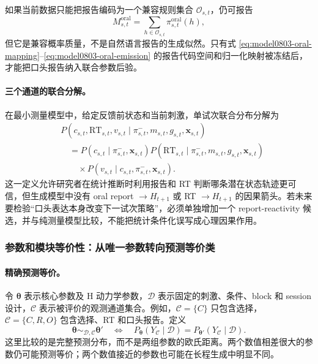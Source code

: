 如果当前数据只能把报告编码为一个兼容规则集合 $\mathcal O_{s,t}$，仍可报告
\begin{equation}
    M^{\mathrm{oral}}_{s,t}
    =\sum_{h\in\mathcal O_{s,t}}
      \pi^{\mathrm{oral}}_{s,t}(h),
\end{equation}
但它是兼容概率质量，不是自然语言报告的生成似然。只有式 \ref{eq:model0803-oral-mapping}--\ref{eq:model0803-oral-emission} 的报告代码空间和归一化映射被冻结后，才能把口头报告纳入联合参数后验。

\paragraph{三个通道的联合分解。}
在最小测量模型中，给定反馈前状态和当前刺激，单试次联合分布分解为
\begin{align}
    &P(c_{s,t},\mathrm{RT}_{s,t},v_{s,t}
      \mid\pi^-_{s,t},m_{s,t},g_{s,t},\mathbf x_{s,t})\nonumber\\
    &\quad=
    P(c_{s,t}\mid\pi^-_{s,t},\mathbf x_{s,t})
    P(\mathrm{RT}_{s,t}\mid
      \pi^-_{s,t},m_{s,t},g_{s,t},\mathbf x_{s,t})\nonumber\\
    &\qquad\times
    P(v_{s,t}\mid
      c_{s,t},\pi^-_{s,t},\mathbf x_{s,t}).
    \label{eq:model0803-joint-emission}
\end{align}
这一定义允许研究者在统计推断时利用报告和 RT 判断哪条潜在状态轨迹更可信，但生成模型中没有 oral report $\rightarrow H_{t+1}$ 或 RT $\rightarrow H_{t+1}$ 的因果箭头。若未来要检验“口头表达本身改变下一试次策略”，必须单独增加一个 report-reactivity 候选，并与纯测量模型比较，不能把统计条件化误写成心理因果作用。


\subsubsection{参数和模块等价性：从唯一参数转向预测等价类}

\paragraph{精确预测等价。}
令 $\boldsymbol\theta$ 表示核心参数及 H 动力学参数，$\mathcal D$ 表示固定的刺激、条件、block 和 session 设计，$\mathcal C$ 表示被评价的观测通道集合。例如，$\mathcal C=\{C\}$ 只包含选择，$\mathcal C=\{C,R,O\}$ 包含选择、RT 和口头报告。定义
\begin{equation}
    \boldsymbol\theta
    \sim_{\mathcal D,\mathcal C}
    \boldsymbol\theta'
    \quad\Longleftrightarrow\quad
    P_{\boldsymbol\theta}
      (Y_{\mathcal C}\mid\mathcal D)
    =
    P_{\boldsymbol\theta'}
      (Y_{\mathcal C}\mid\mathcal D).
    \label{eq:model0803-exact-equivalence}
\end{equation}
这里比较的是完整预测分布，而不是两组参数的欧氏距离。两个数值相差很大的参数仍可能预测等价；两个数值接近的参数也可能在长程生成中明显不同。

